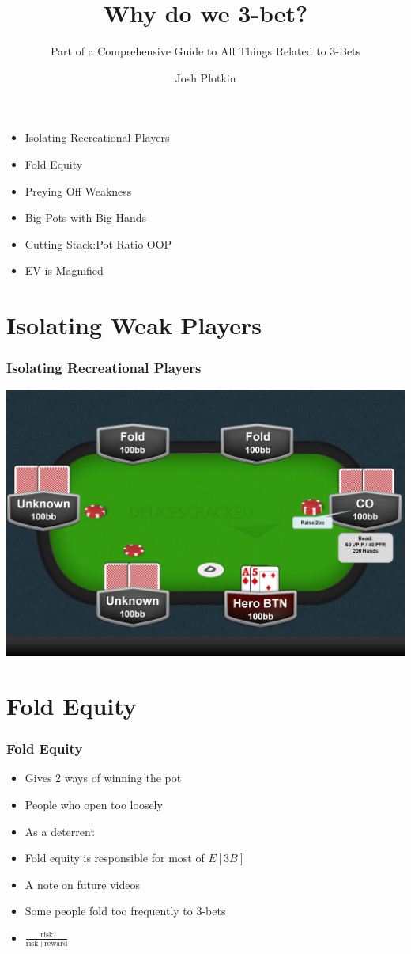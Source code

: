 \documentclass{beamer}
\title{Why do we 3-bet?}
\subtitle{Part of a Comprehensive Guide to All Things Related to 3-Bets}
\author{Josh Plotkin}
\institute{DeucesCracked.com}
\date{}
\begin{document}
\frame{\titlepage}


\section[This Video]{}
\begin{frame}
\begin{itemize}
\frametitle{Outline}
\item Isolating Recreational Players
\pause
\item Fold Equity
\pause
\item Preying Off Weakness
\pause
\item Big Pots with Big Hands
\pause
\item Cutting Stack:Pot Ratio OOP
\pause
\item EV is Magnified
\end{itemize}
\end{frame}


\section{Isolating Weak Players}
\begin{frame}
\frametitle{Isolating Recreational Players}
\includegraphics[keepaspectratio=true,width=.75\paperwidth]{Isolate.png}
\end{frame}


\section{Fold Equity}
\begin{frame}
\frametitle{Fold Equity}
\begin{itemize}
\item Gives 2 ways of winning the pot \pause
\item People who open too loosely \pause
\item As a deterrent \pause
\item Fold equity is responsible for most of $E[3B]$ \pause
\item A note on future videos \pause
\item Some people fold too frequently to 3-bets \pause
\item $\frac{\text{risk}}{\text{risk}+\text{reward}}$
\end{itemize}
\end{frame}
\end{document}
